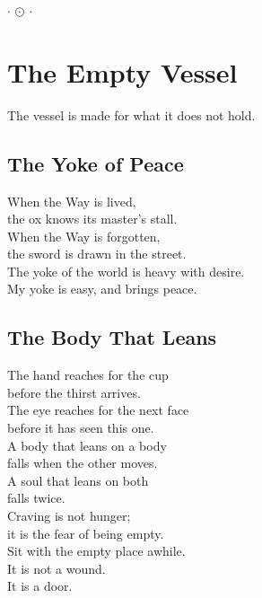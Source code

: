 \documentclass[10pt, openright]{book}
\newcommand{\sectionbreak}{\filbreak}
\newcommand{\sayingsource}[1]{\par\nopagebreak\vspace{0.3\baselineskip}{\raggedleft\footnotesize\itshape #1\par}}
\newcommand{\ornament}{
    \vspace{1.5cm}
    \begin{center}
        \large \(\cdot\) \(\odot\) \(\cdot\)
    \end{center}
    \vspace{1.5cm}
}
\begin{document}
\sayingsource{Tao Te Ching 45}

\ornament

\chapter{The Empty Vessel}\label{the-empty-vessel}

\begin{center}
The vessel is made for what it does not hold.
\end{center}

\sectionbreak

\section{The Yoke of Peace}\label{the-yoke-of-peace}

When the Way is lived,\\
the ox knows its master's stall.\\
When the Way is forgotten,\\
the sword is drawn in the street.\\
The yoke of the world is heavy with desire.\\
My yoke is easy, and brings peace.

\sayingsource{Tao Te Ching 46 · Thomas 90 · Matthew 11:30}

\sectionbreak

\section{The Body That Leans}\label{the-body-that-leans}

The hand reaches for the cup\\
before the thirst arrives.\\
The eye reaches for the next face\\
before it has seen this one.\\
A body that leans on a body\\
falls when the other moves.\\
A soul that leans on both\\
falls twice.\\
Craving is not hunger;\\
it is the fear of being empty.\\
Sit with the empty place awhile.\\
It is not a wound.\\
It is a door.
\end{document}
